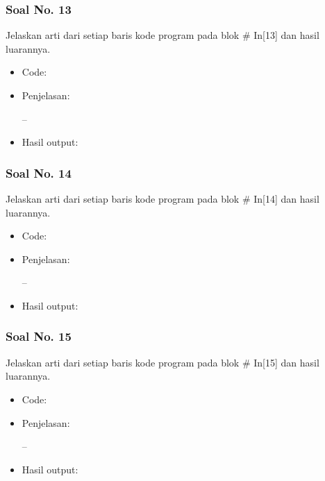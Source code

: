 \subsubsection{Soal No. 13}
Jelaskan arti dari setiap baris kode program pada blok \# In[13] dan hasil luarannya.

\begin{itemize}
\item Code:


\item Penjelasan:

--

\item Hasil output:

\end{itemize}

\subsubsection{Soal No. 14}
Jelaskan arti dari setiap baris kode program pada blok \# In[14] dan hasil luarannya.

\begin{itemize}
\item Code:


\item Penjelasan:

--

\item Hasil output:

\end{itemize}

\subsubsection{Soal No. 15}
Jelaskan arti dari setiap baris kode program pada blok \# In[15] dan hasil luarannya.

\begin{itemize}
\item Code:


\item Penjelasan:

--

\item Hasil output:

\end{itemize}

